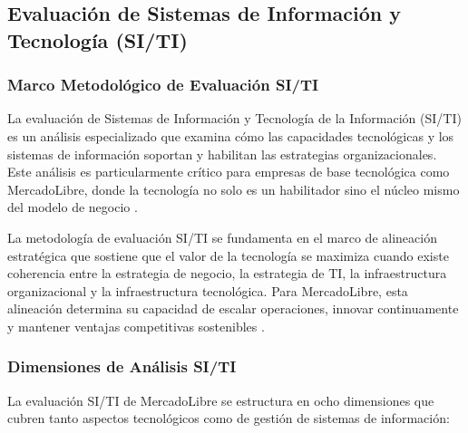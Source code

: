 \subsection{Evaluación de Sistemas de Información y Tecnología (SI/TI)}
\label{sec:evaluacion_siti}

\subsubsection{Marco Metodológico de Evaluación SI/TI}

La evaluación de Sistemas de Información y Tecnología de la Información (SI/TI) es un análisis especializado que examina cómo las capacidades tecnológicas y los sistemas de información soportan y habilitan las estrategias organizacionales. Este análisis es particularmente crítico para empresas de base tecnológica como MercadoLibre, donde la tecnología no solo es un habilitador sino el núcleo mismo del modelo de negocio \autocite{porter1985}.

La metodología de evaluación SI/TI se fundamenta en el marco de alineación estratégica que sostiene que el valor de la tecnología se maximiza cuando existe coherencia entre la estrategia de negocio, la estrategia de TI, la infraestructura organizacional y la infraestructura tecnológica. Para MercadoLibre, esta alineación determina su capacidad de escalar operaciones, innovar continuamente y mantener ventajas competitivas sostenibles \autocite{teece2007}.

\subsubsection{Dimensiones de Análisis SI/TI}

La evaluación SI/TI de MercadoLibre se estructura en ocho dimensiones que cubren tanto aspectos tecnológicos como de gestión de sistemas de información:

